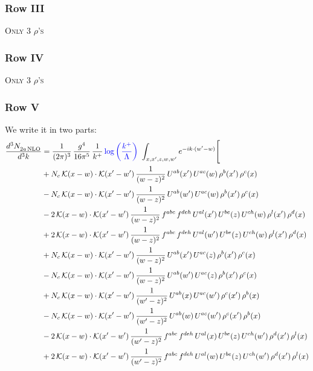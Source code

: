 \documentclass[9pt]{article}
\numberwithin{equation}{section}
\begin{document}
\subsubsection{Row III}
\textsc{Only 3 $\rho$'s}
\subsubsection{Row IV}
\textsc{Only 3 $\rho$'s}
\subsubsection{Row V}
We write it in two parts: 
\begin{align}
    \frac{d^{3}N_{2a\,\rm NLO}^{\rm}}{d^{3}k}  & = \frac{1}{(2\pi)^{3}}\,\frac{g^{4}}{16\pi^{5}}\,\frac{1}{k^{+}}\,{\color{blue}\log{\left(\frac{k^{+}}{\Lambda}\right)}}\,\,\int_{x,x',z,w,w'}e^{-ik\cdot(w'-w)}\Bigg[\notag\\
&+N_{c}\,\mathcal{K}(x-w)\cdot\mathcal{K}(x'-w')\,\frac{1}{(w-z)^{2}}\,U^{ab}(x')\,U^{ac}(w)\,\rho^{b}(x')\,\rho^{c}(x)\notag\\
&-N_{c}\,\mathcal{K}(x-w)\cdot\mathcal{K}(x'-w')\,\frac{1}{(w-z)^{2}}\,U^{ab}(w')\,U^{ac}(w)\,\rho^{b}(x')\,\rho^{c}(x)\notag\\
&-2\,\mathcal{K}(x-w)\cdot\mathcal{K}(x'-w')\,\frac{1}{(w-z)^{2}}\,f^{abc}\,f^{deh}\,U^{al}(x')\,U^{be}(z)\,U^{ch}(w)\,\rho^{l}(x')\,\rho^{d}(x)\notag\\
&+2\,\mathcal{K}(x-w)\cdot\mathcal{K}(x'-w')\,\frac{1}{(w-z)^{2}}\,f^{abc}\,f^{deh}\,U^{al}(w')\,U^{be}(z)\,U^{ch}(w)\,\rho^{l}(x')\,\rho^{d}(x)\notag\\
&+N_{c}\,\mathcal{K}(x-w)\cdot\mathcal{K}(x'-w')\,\frac{1}{(w-z)^{2}}\,U^{ab}(x')\,U^{ac}(z)\,\rho^{b}(x')\,\rho^{c}(x)\notag\\
&-N_{c}\,\mathcal{K}(x-w)\cdot\mathcal{K}(x'-w')\,\frac{1}{(w-z)^{2}}\,U^{ab}(w')\,U^{ac}(z)\,\rho^{b}(x')\,\rho^{c}(x)\notag\\
&+N_{c}\,\mathcal{K}(x-w)\cdot\mathcal{K}(x'-w')\,\frac{1}{(w'-z)^{2}}\,U^{ab}(x)\,U^{ac}(w')\,\rho^{c}(x')\,\rho^{b}(x)\notag\\
&-N_{c}\,\mathcal{K}(x-w)\cdot\mathcal{K}(x'-w')\,\frac{1}{(w'-z)^{2}}\,U^{ab}(w)\,U^{ac}(w')\,\rho^{c}(x')\,\rho^{b}(x)\notag\\
&-2\,\mathcal{K}(x-w)\cdot\mathcal{K}(x'-w')\,\frac{1}{(w'-z)^{2}}\,f^{abc}\,f^{deh}\,U^{al}(x)\,U^{be}(z)\,U^{ch}(w')\,\rho^{d}(x')\,\rho^{l}(x)\notag\\
&+2\,\mathcal{K}(x-w)\cdot\mathcal{K}(x'-w')\,\frac{1}{(w'-z)^{2}}\,f^{abc}\,f^{deh}\,U^{al}(w)\,U^{be}(z)\,U^{ch}(w')\,\rho^{d}(x')\,\rho^{l}(x)\notag\\

\end{align}
\end{document}
